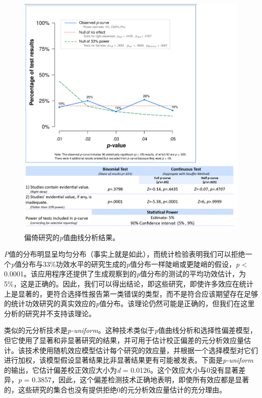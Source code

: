 \documentclass[
  letterpaper,
  DIV=11,
  numbers=noendperiod]{scrreprt}
\begin{document}
\begin{figure}

{\centering \includegraphics[width=1\textwidth,height=\textheight]{images/pcurveresult.png}

}

\caption{\label{fig-pcurveresult}偏倚研究的\emph{p}值曲线分析结果。}

\end{figure}

\emph{P}值的分布明显呈均匀分布（事实上就是如此），而统计检验表明我们可以拒绝一个\emph{p}值分布与33\%功效水平的研究生成的\emph{p}值分布一样陡峭或更陡峭的假设，\emph{p}
\textless{}
0.0001。该应用程序还提供了生成观察到的\emph{p}值分布的测试的平均功效估计，为5\%，这是正确的。因此，我们可以得出结论，即这些研究，即使许多效应在统计上是显著的，更符合选择性报告第一类错误的类型，而不是符合应该期望存在足够的统计功效研究的真实效应的\emph{p}值分布。该理论仍然可能是正确的，但我们在这里分析的研究并不支持该理论。

类似的元分析技术是\emph{p-uniform}。这种技术类似于\emph{p}值曲线分析和选择性偏差模型，但它使用了显著和非显著研究的结果，并可用于估计校正偏差的元分析效应量估计。该技术使用随机效应模型估计每个研究的效应量，并根据一个选择模型对它们进行加权，该模型假设显著结果比非显著结果更有可能被发表。下面是\emph{p-uniform}的输出，它估计偏差校正效应大小为\emph{d}
= 0.0126。这个效应大小与0没有显著差异，\emph{p} =
0.3857，因此，这个偏差检测技术正确地表明，即使所有效应都是显著的，这些研究的集合也没有提供拒绝0的元分析效应量估计的充分理由。
\end{document}
